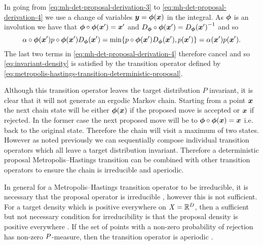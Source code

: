 In going from \eqref{eq:mh-det-proposal-derivation-3} to \eqref{eq:mh-det-proposal-derivation-4} we use a change of variables $\boldsymbol{y} = \boldsymbol{\phi}(\boldsymbol{x})$ in the integral. As $\boldsymbol{\phi}$ is an involution we have that $\boldsymbol{\phi}\circ\boldsymbol{\phi}(\boldsymbol{x}') = \boldsymbol{x}'$ and $\jacobianproddet{\vct{\phi}}\circ\vct{\phi}(\vct{x}') = \jacobproddet{\vct{\phi}}{\vct{x}'}^{-1}$ and so
\begin{equation*}\label{eq:mh-det-proposal-derivation-5}
  \alpha\circ\vct{\phi}(\vct{x}')  \tgtdens\circ\vct{\phi}(\vct{x}') 
  \jacobproddet{\vct{\phi}}{\vct{x}'} =
  \min\lbr 
    \tgtdens\circ\vct{\phi}(\vct{x}') \jacobproddet{\vct{\phi}}{\vct{x}'},
    p(\vct{x}')
  \rbr 
  =
  \alpha(\vct{x}')\tgtdens(\vct{x}').
\end{equation*}
The last two terms in \eqref{eq:mh-det-proposal-derivation-4} therefore cancel and so \eqref{eq:invariant-density} is satisfied by the transition operator defined by \eqref{eq:metropolis-hastings-transition-deterministic-proposal}. 

Although this transition operator leaves the target distribution $P$ invariant, it is clear that it will not generate an ergodic Markov chain. Starting from a point $\boldsymbol{x}$ the next chain state will be either $\boldsymbol{\phi}(\boldsymbol{x})$ if the proposed move is accepted or $\boldsymbol{x}$ if rejected. In the former case the next proposed move will be to $\boldsymbol{\phi} \circ \boldsymbol{\phi}(\boldsymbol{x}) = \boldsymbol{x}$ i.e. back to the original state. Therefore the chain will visit a maximum of two states. However as noted previously we can sequentially compose individual transition operators which all leave a target distribution invariant. Therefore a deterministic proposal Metropolis--Hastings transition can be combined with other transition operators to ensure the chain is irreducible and aperiodic.

In general for a Metropolis--Hastings transition operator to be irreducible, it is necessary that the proposal operator is irreducible \citep{tierney1994markov}, however this is not sufficient. For a target density which is positive everywhere on $\mathit{X} = \mathbb{R}^D$, then a sufficient but not necessary condition for irreducibility is that the proposal density is positive everywhere \citep{roberts2004general}. If the set of points with a non-zero probability of rejection has non-zero $P$-measure, then the transition operator is aperiodic \citep{tierney1994markov}.

